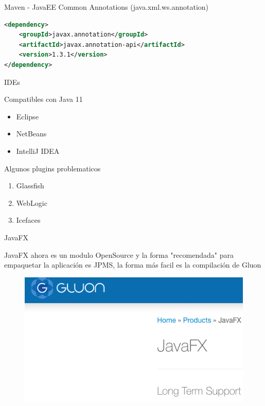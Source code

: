 \documentclass[aspectratio=169]{beamer}
\begin{document}
\begin{frame}[fragile]{Maven - JavaEE}
Common Annotations (java.xml.ws.annotation)

\begin{lstlisting}[language=xml]
<dependency>
    <groupId>javax.annotation</groupId>
    <artifactId>javax.annotation-api</artifactId>
    <version>1.3.1</version>
</dependency>
\end{lstlisting}
\end{frame}

\begin{frame}[fragile]{IDEs}
    
    Compatibles con Java 11
    \begin{itemize}
        \item Eclipse
        \item NetBeans
        \item IntelliJ IDEA
    \end{itemize}
    
    Algunos plugins problematicos
    \begin{enumerate}
        \item Glassfish
        \item WebLogic
        \item Icefaces
    \end{enumerate}
\end{frame}

\begin{frame}[fragile]{JavaFX}
    
    JavaFX ahora es un modulo OpenSource y la forma "recomendada" para empaquetar la aplicación es JPMS, la forma más facil es la compilación de Gluon
    \begin{figure}
        \centering
        \includegraphics[width=\linewidth]{Images/gluon}
    \end{figure}
\end{frame}
\end{document}
